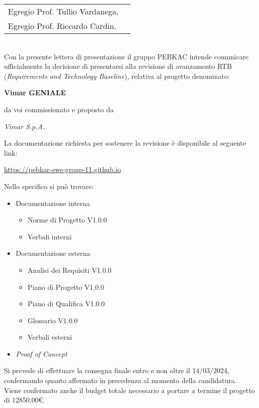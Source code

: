 \documentclass[12pt, a4paper]{article}
\begin{document}

\begin{tabular}{@{}l l@{}}
  Egregio Prof. Tullio Vardanega, &  \\Egregio Prof. Riccardo Cardin,
\end{tabular}
\\

Con la presente lettera di presentazione il gruppo PEBKAC intende comunicare ufficialmente la decisione di presentarsi alla revisione di avanzamento RTB (\textit{Requirements and Technology Baseline}), relativa al progetto denominato:

{\huge\begin{center}\textbf{Vimar GENIALE}\end{center}}

da voi commissionato e proposto da 
{\begin{center}\textit{Vimar S.p.A.}\end{center}}

La documentazione richiesta per sostenere la revisione è disponibile al seguente link:

\begin{center}
\href{https://pebkac-swe-group-11.github.io}{https://pebkac-swe-group-11.github.io}
\end{center}

\newpage
Nello specifico si può trovare:
\begin{itemize}
    \item Documentazione interna
    \begin{itemize}
        \item Norme di Progetto V1.0.0
        \item Verbali interni            
    \end{itemize}
    \item Documentazione esterna
    \begin{itemize}
        \item Analisi dei Requisiti V1.0.0
        \item Piano di Progetto V1.0.0
        \item Piano di Qualifica V1.0.0
        \item Glossario V1.0.0
        \item Verbali esterni            
    \end{itemize}
    \item \textit{Proof of Concept}
\end{itemize}

Si prevede di effettuare la consegna finale entro e non oltre il 14/03/2024, confermando quanto affermato in precedenza al momento della candidatura. Viene confermato anche il budget totale necessario  a portare a termine il progetto di 12850,00\euro.
\end{document}
